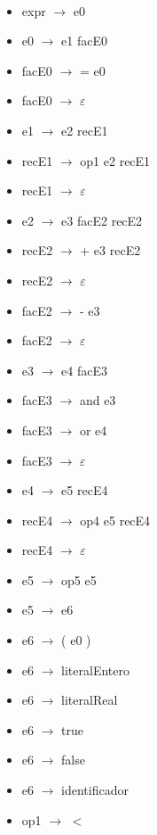 \documentclass[11pt]{article}
\begin{document}
            \ 
            \begin{itemize}
                \item expr $\rightarrow$ e0
                \item e0 $\rightarrow$ e1 facE0
                \item facE0 $\rightarrow$ = e0
                \item facE0 $\rightarrow$ $\varepsilon$
                \item e1 $\rightarrow$ e2 recE1
                \item recE1 $\rightarrow$ op1 e2 recE1
                \item recE1 $\rightarrow$ $\varepsilon$
                \item e2 $\rightarrow$ e3 facE2 recE2
                \item recE2 $\rightarrow$ + e3 recE2
                \item recE2 $\rightarrow$ $\varepsilon$
                \item facE2  $\rightarrow$ - e3
                \item facE2  $\rightarrow$ $\varepsilon$
                \item e3 $\rightarrow$ e4 facE3
                \item facE3 $\rightarrow$ and e3
                \item facE3 $\rightarrow$ or e4
                \item facE3 $\rightarrow$ $\varepsilon$
                \item e4 $\rightarrow$ e5 recE4
                \item recE4 $\rightarrow$ op4 e5 recE4
                \item recE4 $\rightarrow$ $\varepsilon$
                \item e5 $\rightarrow$ op5 e5
                \item e5 $\rightarrow$ e6
                \item e6 $\rightarrow$ ( e0 )
                \item e6 $\rightarrow$ literalEntero
                \item e6 $\rightarrow$ literalReal
                \item e6 $\rightarrow$ true
                \item e6 $\rightarrow$ false
                \item e6 $\rightarrow$ identificador
                \item op1 $\rightarrow$ $<$

\end{itemize}
\end{document}
